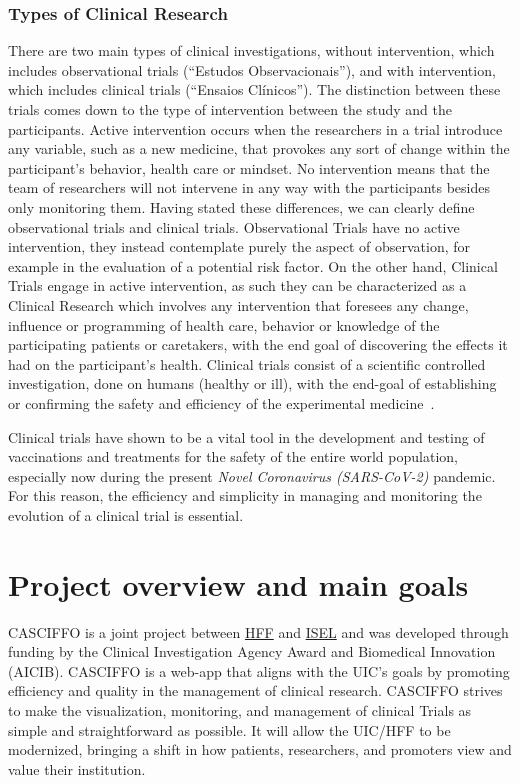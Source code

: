 \subsubsection{Types of Clinical Research}
There are two main types of clinical investigations, without intervention, which includes observational trials (``Estudos Observacionais''), and with intervention, which includes clinical trials (``Ensaios Clínicos''). The distinction between these trials comes down to the type of intervention between the study and the participants. Active intervention occurs when the researchers in a trial introduce any variable, such as a new medicine, that provokes any sort of change within the participant's behavior, health care or mindset. No intervention means that the team of researchers will not intervene in any way with the participants besides only monitoring them.
Having stated these differences, we can clearly define observational trials and clinical trials.
Observational Trials have no active intervention, they instead contemplate purely the aspect of observation, for example in the evaluation of a potential risk factor. On the other hand, Clinical Trials engage in active intervention, as such they can be characterized as a Clinical Research which involves any intervention that foresees any change, influence or programming of health care, behavior or knowledge of the participating patients or caretakers, with the end goal of discovering the effects it had on the participant's health.
Clinical trials consist of a scientific controlled investigation, done
on humans (healthy or ill), with the end-goal of establishing or confirming the safety and efficiency of the experimental medicine~\cite{tipos-de-ensaios}.  

Clinical trials have shown to be a vital tool in the development and testing of vaccinations and treatments for the safety of the entire world population, especially now during the present \textit{Novel Coronavirus (SARS-CoV-2)} pandemic. For this reason, the efficiency and simplicity in managing and monitoring the evolution of a clinical trial is essential.  

\section{Project overview and main goals}\label{ch:intro:sec:casciffo}

CASCIFFO is a joint project between \href{https://hff.min-saude.pt/}{HFF} and \href{https://www.isel.pt/}{ISEL} and was developed through funding by the Clinical Investigation Agency Award and Biomedical Innovation (AICIB).  
CASCIFFO is a web-app that aligns with the UIC's goals by promoting efficiency and quality in the management of clinical research.
CASCIFFO strives to make the visualization, monitoring, and management of clinical Trials as simple and straightforward as possible.   
It will allow the UIC/HFF to be modernized, bringing a shift in how patients, researchers, and promoters view and value their institution.  

